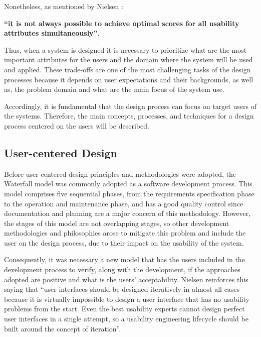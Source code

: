 Nonetheless, as mentioned by Nielsen \cite{usabilityEngineering}: 

\begin{center}
	\textbf{“it is not always possible to achieve optimal scores for all usability attributes simultaneously”}.
\end{center} 

Thus, when a system is designed it is necessary to prioritize what are the most important attributes for the users and the domain where the system will be used and applied. These trade-offs are one of the most challenging tasks of the design processes because it depends on user expectations and their backgrounds, as well as, the problem domain and what are the main focus of the system use.

Accordingly, it is fundamental that the design process can focus on target users of the systems. Therefore, the main concepts, processes, and techniques for a design process centered on the users will be described.

\subsection{User-centered Design}
\label{subsec:user_centered_design}
Before user-centered design principles and methodologies were adopted, the Waterfall model was commonly adopted as a software development process. This model comprises five sequential phases, from the requirements specification phase to the operation and maintenance phase, and has a good quality control since documentation and planning are a major concern of this methodology.\cite{aComparisonBetweenThreeSDLCModelsWatterfallSpiralIncrementalIterative} However, the stages of this model are not overlapping stages, so other development methodologies and philosophies arose to mitigate this problem and include the user on the design process, due to their impact on the usability of the system.

Consequently, it was necessary a new model that has the users included in the development process to verify, along with the development, if the approaches adopted are positive and what is the users' acceptability. Nielsen \cite{iterativeUserInterfaceDesign} reinforces this saying that “user interfaces should be designed iteratively in almost all cases because it is virtually impossible to design a user interface that has no usability problems from the start. Even the best usability experts cannot design perfect user interfaces in a single attempt, so a usability engineering lifecycle should be built around the concept of iteration”.

